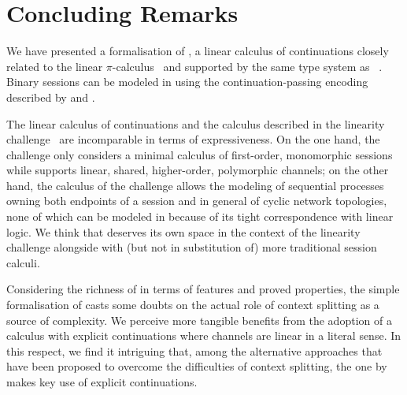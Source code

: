 \section{Concluding Remarks}
\label{sec:conclusion}

We have presented a formalisation of \LCC, a linear calculus of continuations
closely related to the linear $\pi$-calculus~\cite{KobayashiPierceTurner99} and
supported by the same type system as \CP~\cite{Wadler14}. Binary sessions can be
modeled in \LCC using the continuation-passing encoding described by
\citet[extended version]{Kobayashi02b} and \citet{DardhaGiachinoSangiorgi17}.

The linear calculus of continuations and the calculus described in the linearity
challenge~\cite{CarboneEtAl24} are incomparable in terms of expressiveness. On
the one hand, the challenge only considers a minimal calculus of first-order,
monomorphic sessions while \LCC supports linear, shared, higher-order,
polymorphic channels; on the other hand, the calculus of the challenge allows
the modeling of sequential processes owning both endpoints of a session and in
general of cyclic network topologies, none of which can be modeled in \LCC
because of its tight correspondence with linear logic.
%
We think that \LCC deserves its own space in the context of the linearity
challenge alongside with (but not in substitution of) more traditional session
calculi.

Considering the richness of \LCC in terms of features and proved properties, the
simple formalisation of \LCC casts some doubts on the actual role of context
splitting as a source of complexity. We perceive more tangible benefits from the
adoption of a calculus with explicit continuations where channels are linear in
a literal sense.
%
In this respect, we find it intriguing that, among the alternative approaches
that have been proposed to overcome the difficulties of context splitting, the
one by \citet{SanoKavanaghPientka23} makes key use of explicit continuations.


